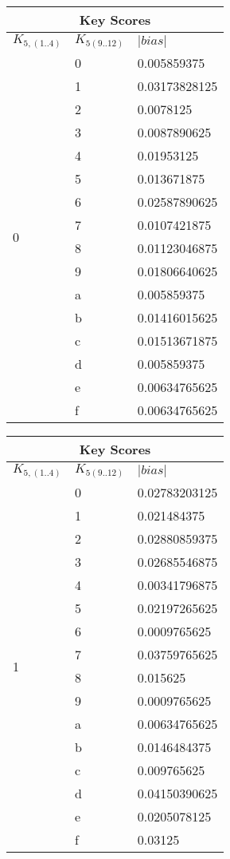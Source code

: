 \documentclass{elsart}
\begin{document}
\begin{tabular}{|l|l|l|}
\hline
\multicolumn{3}{|c|}{Key Scores} \\
\hline
$K_{5,(1..4)}$ & $K_{5(9..12)}$ & $|bias|$  \\ \hline
\multirow{16}{*}{0} & 0 & 0.005859375 \\
 & 1 & 0.03173828125 \\
 & 2 & 0.0078125 \\
 & 3 & 0.0087890625 \\
 & 4 & 0.01953125 \\
 & 5 & 0.013671875 \\
 & 6 & 0.02587890625 \\
 & 7 & 0.0107421875 \\
 & 8 & 0.01123046875 \\
 & 9 & 0.01806640625 \\
 & a & 0.005859375 \\
 & b & 0.01416015625 \\
 & c & 0.01513671875 \\
 & d & 0.005859375 \\
 & e & 0.00634765625 \\
 & f & 0.00634765625 \\ \hline
\end{tabular} 
\begin{tabular}{|l|l|l|}
\hline
\multicolumn{3}{|c|}{Key Scores} \\
\hline
$K_{5,(1..4)}$ & $K_{5(9..12)}$ & $|bias|$  \\ 
\hline
\multirow{16}{*}{1} & 0 & 0.02783203125 \\
 & 1 & 0.021484375 \\
 & 2 & 0.02880859375 \\
 & 3 & 0.02685546875 \\
 & 4 & 0.00341796875 \\
 & 5 & 0.02197265625 \\
 & 6 & 0.0009765625 \\
 & 7 & 0.03759765625 \\
 & 8 & 0.015625 \\
 & 9 & 0.0009765625 \\
 & a & 0.00634765625 \\
 & b & 0.0146484375 \\
 & c & 0.009765625 \\
 & d & 0.04150390625 \\
 & e & 0.0205078125 \\
 & f & 0.03125 \\ \hline
\end{tabular}
\end{document}
